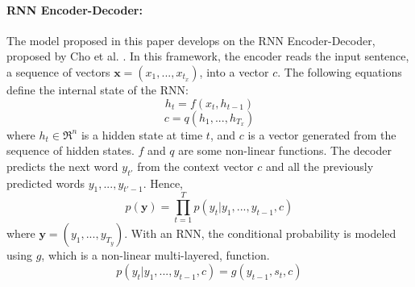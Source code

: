 \documentclass{article}
\begin{document}
	\paragraph{RNN Encoder-Decoder: } The model proposed in this paper develops on the RNN Encoder-Decoder, proposed by Cho et al. \cite{cho}. In this framework, the encoder reads the input sentence, a sequence of vectors \(\textbf{x} = (x_1, ..., x_{t_x})\), into a vector \(c\). The following equations define the internal state of the RNN:
	\[h_t = f(x_t, h_{t-1})\]
	\[c = q({h_1, ..., h _{T_x}})\]
	where \(h_t \in \Re^n\) is a hidden state at time \(t\), and \(c\) is a vector generated from the sequence of hidden states. \(f\) and \(q\) are some non-linear functions. The decoder predicts the next word \(y_{t'}\) from the context vector \(c\) and all the previously predicted words \({y_1, ..., y_{t'-1}}\). Hence,
	\[p(\textbf{y}) = \prod_{t=1}^{T} p(y_t | y_1, ..., y_{t-1}, c)\]
	where \(\textbf{y} = (y_1, ..., y_{T_y})\). With an RNN, the conditional probability is modeled using \(g\), which is a non-linear multi-layered, function. 
	\[p(y_t | y_1, ..., y_{t-1}, c) = g(y_{t-1}, s_t, c)\]
	
\end{document}

